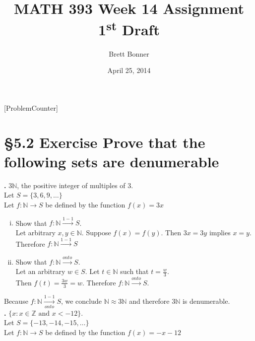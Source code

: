 \documentclass[a4paper,11pt]{article}
\begin{document}
\newtheorem*{theorem1}{Theorem}
\newtheorem*{theorem2}{Theorem}
\newtheorem*{theorem3}{Theorem}
\newtheorem*{theorem4}{Theorem}
\newtheorem*{theorem5}{Theorem}
\newtheorem*{theorem6}{Theorem}
\newtheorem*{theorem7}{Theorem}
\newtheorem*{theorem8}{Theorem}
\newtheorem*{theorem9}{True/False?}
\title{MATH 393 Week 14 Assignment 1\textsuperscript{st} Draft}
\author{Brett Bonner}
\date{April 25, 2014}
\maketitle
\doublespacing
{}
[ProblemCounter]
\setcounter{ProblemCounter}{3}
\section*{\S 5.2 Exercise  Prove that the following sets are denumerable}
\setcounter{SubsectionCounter}{2}
\textbf{.} \(3\mathbb{N}\), the 
positive integer of multiples of \(3\).\\
Let \(S = \{3, 6, 9, \ldots\}\)\\
Let \(f:\mathbb{N} \rightarrow S\) be defined by the function \(f{(x)} = 3x\)
    \begin{enumerate}[(i)]
      \item Show that \(f:\mathbb{N} \xrightarrow{1-1} S\).\\
      Let arbitrary \(x,y \in \mathbb{N}\). Suppose \(f{(x)}=f{(y)}\). Then \(3x = 3y\) 
      implies \(x = y\). Therefore \(f:\mathbb{N} \xrightarrow{1-1} S\)
      \item Show that \(f:\mathbb{N} \xrightarrow{onto} S\).\\
     Let an arbitrary \(w \in S\). Let \(t \in \mathbb{N}\) such that \(t = \frac{w}{3}\).\\
     Then \(f{(t)} = \frac{3w}{3} = w\). Therefore \(f:\mathbb{N} \xrightarrow{onto} S\).
    \end{enumerate}
    Because \(f: \mathbb{N} \xrightarrow[onto]{1-1} S\), we conclude \(\mathbb{N} \approx 3\mathbb{N}\) and therefore \(3\mathbb{N}\) is 
    denumerable.\\
\newpage
\setcounter{SubsectionCounter}{5}
\noindent\textbf{.} \(\{x:x \in \mathbb{Z} \text{ and } x < -12\}\).\\
Let \(S = \{-13,-14,-15,\ldots\}\)\\
Let \(f:\mathbb{N} \rightarrow S\) be defined by the function \(f{(x)} = -x - 12\)
\end{document}
